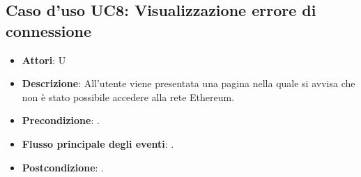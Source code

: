 \subsection{Caso d'uso \hypertarget{UC8}{UC8}: Visualizzazione errore di connessione}
\begin{itemize}
\item \textbf{Attori}: U
\item \textbf{Descrizione}: All'utente viene presentata una pagina nella quale si avvisa che non è stato possibile accedere alla rete Ethereum. 
\item \textbf{Precondizione}: . 
\item \textbf{Flusso principale degli eventi}: . 
\item \textbf{Postcondizione}: . 
\end{itemize}
